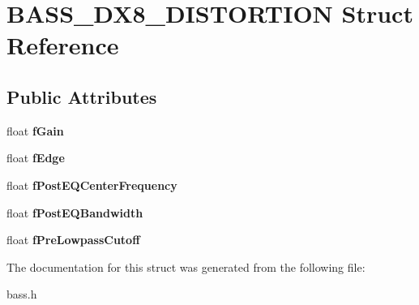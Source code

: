 \section{B\+A\+S\+S\+\_\+\+D\+X8\+\_\+\+D\+I\+S\+T\+O\+R\+T\+I\+O\+N Struct Reference}
\label{struct_b_a_s_s___d_x8___d_i_s_t_o_r_t_i_o_n}
\subsection*{Public Attributes}
\begin{DoxyCompactItemize}
\item 
float {\bfseries f\+Gain}\label{struct_b_a_s_s___d_x8___d_i_s_t_o_r_t_i_o_n_aae2a552fff6dec886b79c64c3c985890}

\item 
float {\bfseries f\+Edge}\label{struct_b_a_s_s___d_x8___d_i_s_t_o_r_t_i_o_n_a277a36a502bed47facd8be9fe06cfb0e}

\item 
float {\bfseries f\+Post\+E\+Q\+Center\+Frequency}\label{struct_b_a_s_s___d_x8___d_i_s_t_o_r_t_i_o_n_a90e66d9e0cfc132efa0e68429c5cf81d}

\item 
float {\bfseries f\+Post\+E\+Q\+Bandwidth}\label{struct_b_a_s_s___d_x8___d_i_s_t_o_r_t_i_o_n_a0825b5f7724ac6c4c9de9d71c4a48d0b}

\item 
float {\bfseries f\+Pre\+Lowpass\+Cutoff}\label{struct_b_a_s_s___d_x8___d_i_s_t_o_r_t_i_o_n_a1397454ba65a389b7b2a41bb93d10290}

\end{DoxyCompactItemize}


The documentation for this struct was generated from the following file\+:\begin{DoxyCompactItemize}
\item 
bass.\+h\end{DoxyCompactItemize}
